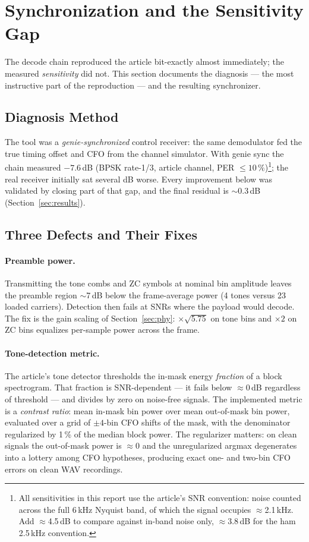 \section{Synchronization and the Sensitivity Gap}
\label{sec:sync}

The decode chain reproduced the article bit-exactly almost immediately;
the measured \emph{sensitivity} did not.  This section documents the
diagnosis --- the most instructive part of the reproduction --- and the
resulting synchronizer.

\subsection{Diagnosis Method}

The tool was a \emph{genie-synchronized} control receiver: the same
demodulator fed the true timing offset and CFO from the channel
simulator.  With genie sync the chain measured $-7.6$\,dB (BPSK
rate-1/3, article channel, PER $\le 10\,\%$)\footnote{All
sensitivities in this report use the article's SNR convention: noise
counted across the full 6\,kHz Nyquist band, of which the signal
occupies $\approx$2.1\,kHz.  Add $\approx$4.5\,dB to compare against
in-band noise only, $\approx$3.8\,dB for the ham 2.5\,kHz
convention.}; the real receiver
initially sat several dB worse.  Every improvement below was validated
by closing part of that gap, and the final residual is $\sim$0.3\,dB
(Section~\ref{sec:results}).

\subsection{Three Defects and Their Fixes}

\paragraph{Preamble power.}  Transmitting the tone combs and ZC symbols
at nominal bin amplitude leaves the preamble region $\sim$7\,dB below
the frame-average power (4 tones versus 23 loaded carriers).  Detection
then fails at SNRs where the payload would decode.  The fix is the
gain scaling of Section~\ref{sec:phy}: $\times\sqrt{5.75}$ on tone
bins and $\times 2$ on ZC bins equalizes per-sample power across the
frame.

\paragraph{Tone-detection metric.}  The article's tone detector
thresholds the in-mask energy \emph{fraction} of a block spectrogram.
That fraction is SNR-dependent --- it fails below $\approx$0\,dB
regardless of threshold --- and divides by zero on noise-free signals.
The implemented metric is a \emph{contrast ratio}: mean in-mask bin
power over mean out-of-mask bin power, evaluated over a grid of
$\pm 4$-bin CFO shifts of the mask, with the denominator regularized
by 1\,\% of the median block power.  The regularizer matters: on clean
signals the out-of-mask power is $\approx$0 and the unregularized
argmax degenerates into a lottery among CFO hypotheses, producing exact
one- and two-bin CFO errors on clean WAV recordings.


